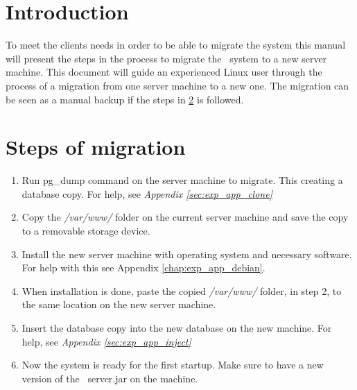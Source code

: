 \label{chap:exp_app_migration}
\section{Introduction}
To meet the clients needs in order to be able to migrate the system this manual will present the steps in the process to migrate the \appName\ system to a new server machine. This document will guide an experienced Linux user through the process of a migration from one server machine to a new one. The migration can be seen as a manual backup if the steps in \ref{sec:exp_steps} is followed. 

\section{Steps of migration}\label{sec:exp_steps}
\begin{enumerate}
	\item Run pg\_dump command on the server machine to migrate. This creating a database copy. For help, see \emph{Appendix \ref{sec:exp_app_clone}}
	\item Copy the \emph{/var/www/} folder on the current server machine and save the copy to a removable storage device.
	\item Install the new server machine with operating system and necessary software. For help with this see Appendix \ref{chap:exp_app_debian}.
	\item When installation is done, paste the copied \emph{/var/www/} folder, in step 2, to the same location on the new server machine. 
	\item Insert the database copy into the new database on the new machine. For help, see \emph{Appendix \ref{sec:exp_app_inject}}
	\item Now the system is ready for the first startup. Make sure to have a new version of the \appName\ server.jar on the machine.
\end{enumerate}


